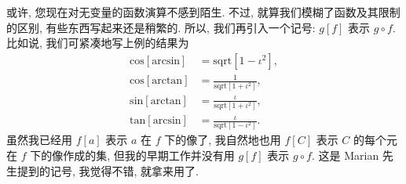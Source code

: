 \begin{remark}
    或许, 您现在对无变量的函数演算不感到陌生. 不过, 就算我们模糊了函数及其限制的区别, 有些东西写起来还是稍繁的. 所以, 我们再引入一个记号: $g[f]$ 表示 $g \circ f$. 比如说, 我们可紧凑地写上例的结果为
    \begin{align*}
        \mathrm{cos} [\mathrm{arcsin}] & = \mathrm{sqrt} [1 - \iota^2],               \\
        \mathrm{cos} [\mathrm{arctan}] & = \frac{1}{\mathrm{sqrt} [1 + \iota^2]},     \\
        \mathrm{sin} [\mathrm{arctan}] & = \frac{\iota}{\mathrm{sqrt} [1 + \iota^2]}, \\
        \mathrm{tan} [\mathrm{arcsin}] & = \frac{\iota}{\mathrm{sqrt} [1 - \iota^2]}.
    \end{align*}
    虽然我已经用 $f[a]$ 表示 $a$ 在 $f$ 下的像了, 我自然地也用 $f[C]$ 表示 $C$ 的每个元在 $f$ 下的像作成的集, 但我的早期工作并没有用 $g[f]$ 表示 $g \circ f$. 这是 Marian 先生提到的记号, 我觉得不错, 就拿来用了.
\end{remark}
